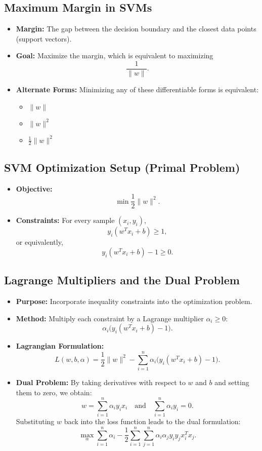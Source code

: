 \subsection{Maximum Margin in SVMs}
\begin{itemize}
    \item \textbf{Margin:} The gap between the decision boundary and the closest data points (support vectors).
    \item \textbf{Goal:} Maximize the margin, which is equivalent to maximizing 
    \[
    \frac{1}{\|w\|}.
    \]
    \item \textbf{Alternate Forms:} Minimizing any of these differentiable forms is equivalent:
    \begin{itemize}
        \item \(\|w\|\)
        \item \(\|w\|^2\)
        \item \(\frac{1}{2}\|w\|^2\)
    \end{itemize}
\end{itemize}

\subsection{SVM Optimization Setup (Primal Problem)}
\begin{itemize}
    \item \textbf{Objective:}
    \[
    \min \frac{1}{2}\|w\|^2.
    \]
    \item \textbf{Constraints:} For every sample \((x_i, y_i)\),
    \[
    y_i (w^T x_i + b) \geq 1,
    \]
    or equivalently,
    \[
    y_i (w^T x_i + b) - 1 \geq 0.
    \]
\end{itemize}

\subsection{Lagrange Multipliers and the Dual Problem}
\begin{itemize}
    \item \textbf{Purpose:} Incorporate inequality constraints into the optimization problem.
    \item \textbf{Method:} Multiply each constraint by a Lagrange multiplier \(\alpha_i \geq 0\):
    \[
    \alpha_i \bigl( y_i (w^T x_i + b) - 1 \bigr).
    \]
    \item \textbf{Lagrangian Formulation:}
    \[
    L(w, b, \alpha) = \frac{1}{2}\|w\|^2 - \sum_{i=1}^{n} \alpha_i \bigl( y_i (w^T x_i + b) - 1 \bigr).
    \]
    \item \textbf{Dual Problem:} By taking derivatives with respect to \(w\) and \(b\) and setting them to zero, we obtain:
    \[
    w = \sum_{i=1}^{n} \alpha_i y_i x_i \quad \text{and} \quad \sum_{i=1}^{n} \alpha_i y_i = 0.
    \]
    Substituting \(w\) back into the loss function leads to the dual formulation:
    \[
    \max_{\alpha} \sum_{i=1}^{n} \alpha_i - \frac{1}{2} \sum_{i=1}^{n} \sum_{j=1}^{n} \alpha_i \alpha_j y_i y_j x_i^T x_j.
    \]
\end{itemize}

